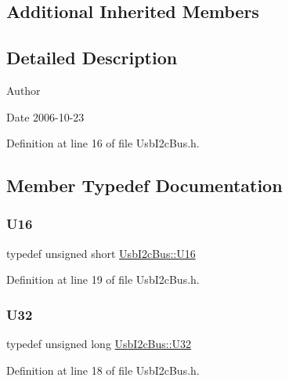 \subsection*{Additional Inherited Members}


\subsection{Detailed Description}
\begin{DoxyAuthor}{Author}

\end{DoxyAuthor}
\begin{DoxyDate}{Date}
2006-\/10-\/23 
\end{DoxyDate}


Definition at line 16 of file Usb\+I2c\+Bus.\+h.



\subsection{Member Typedef Documentation}
\mbox{\label{classUsbI2cBus_ab9e591a682274de9311c9596ea0482a0}} 
\subsubsection{\texorpdfstring{U16}{U16}}
{\footnotesize\ttfamily typedef unsigned short \hyperlink{classUsbI2cBus_ab9e591a682274de9311c9596ea0482a0}{Usb\+I2c\+Bus\+::\+U16}}



Definition at line 19 of file Usb\+I2c\+Bus.\+h.

\mbox{\label{classUsbI2cBus_a9dfe5e7ebbbbeae2880af6739ae1adb3}} 
\subsubsection{\texorpdfstring{U32}{U32}}
{\footnotesize\ttfamily typedef unsigned long \hyperlink{classUsbI2cBus_a9dfe5e7ebbbbeae2880af6739ae1adb3}{Usb\+I2c\+Bus\+::\+U32}}



Definition at line 18 of file Usb\+I2c\+Bus.\+h.

\mbox{\label{classUsbI2cBus_a06be0e3e19b0f6eee34d3537bb31960e}} 
